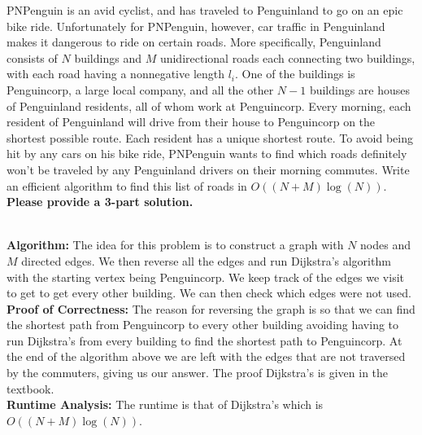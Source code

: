 \documentclass[10.5pt]{article}
\begin{document}
\newpage
{}

PNPenguin is an avid cyclist, and has traveled to Penguinland to go on an epic bike ride. Unfortunately for PNPenguin, however, car traffic in Penguinland makes it dangerous to ride on certain roads.
\newline
\newline
More specifically, Penguinland consists of $N$ buildings and $M$ unidirectional roads each connecting two buildings, with each road having a nonnegative length $l_i$. One of the buildings is Penguincorp, a large local company, and all the other $N - 1$ buildings are houses of Penguinland residents, all of whom work at Penguincorp. Every morning, each resident of Penguinland will drive from their house to Penguincorp on the shortest possible route. Each resident has a unique shortest route.
\newline
\newline
To avoid being hit by any cars on his bike ride, PNPenguin wants to find which roads definitely won't be traveled by any Penguinland drivers on their morning commutes. Write an efficient algorithm to find this list of roads in $O((N + M)\log(N))$.\\
\newline
\textbf{Please provide a 3-part solution.}\\
\begin{solution}\\
    \textbf{Algorithm:} The idea for this problem is to construct a graph with $N$ nodes and $M$ directed edges. We then reverse all the edges and run Dijkstra's algorithm
    with the starting vertex being Penguincorp. We keep track of 
    the edges we visit to get to get every other building. We can then check which edges were not used.\\
    \textbf{Proof of Correctness:} The reason for reversing the graph is so that we can find the shortest path from Penguincorp to 
    every other building avoiding having to run Dijkstra's from every building to find the shortest path to Penguincorp. At the end of the algorithm above we are left with the edges that are not traversed by the commuters, giving us our answer. The proof 
    Dijkstra's is given in the textbook.\\
    \textbf{Runtime Analysis:} The runtime is that of Dijkstra's which is $O((N + M)\log(N))$.
\end{solution}
\end{document}
